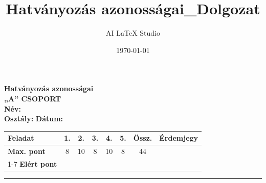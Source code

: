 \documentclass[a4paper,11pt]{article}
\title{Hatványozás azonosságai_Dolgozat}
\author{AI LaTeX Studio}
\date{\today}
\begin{document}

\noindent
\begin{minipage}[t]{0.45\textwidth}
  \vspace{0pt}
  
  {\Large\textbf{Hatványozás azonosságai}}\\[2mm]
  {\large\textbf{„A” CSOPORT}}\\[2mm]
  \textbf{Név:} \underline{\hspace{4.5cm}}\\[2mm]
  \textbf{Osztály:} \underline{\hspace{1.5cm}} \quad \textbf{Dátum:} \underline{\hspace{2cm}}
\end{minipage}
\hfill
\begin{minipage}[t]{0.53\textwidth}
  \vspace{0pt}
  \begin{flushright}
  {\small
  \begin{tabular}{|l|c|c|c|c|c||c||c|}
    \hline
    \textbf{Feladat} & 1. & 2. & 3. & 4. & 5. & \textbf{Össz.} & \textbf{Érdemjegy} \\ \hline
    \textbf{Max. pont} & 8 & 10 & 8 & 10 & 8 & 44 & \\ \cline{1-7}
    \textbf{Elért pont} &  &  &  &  &  &  & \\ \hline
  \end{tabular}
  }
  \end{flushright}
\end{minipage}
\vspace{2mm}
\hrule
\vspace{4mm}
\end{document}
